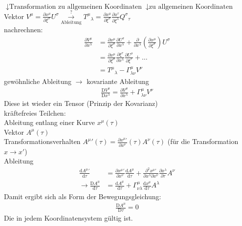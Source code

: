 \documentclass[a4paper]{article}
\begin{document}
$\downarrow \text{Transformation zu allgemeinen
Koordinaten}$$\downarrow\text{zu allgemeinen Koordinaten}$\\
Vektor $V^\mu=\frac{\partial x^\mu}{\partial \xi^\sigma}
U^\sigma\overset{?}{\underset{\text{Ableitung}}{\longrightarrow}}T^\mu{}_\lambda=
\frac{\partial x^\mu}{\partial \xi^\sigma}\frac{\partial x^\tau}{\partial
\xi^\lambda} Q^\sigma{}_\tau$\\
nachrechnen:
\begin{align}
\frac{\partial V^\mu}{\partial x^\lambda}&=\frac{\partial x^\mu}{\partial
\xi^\sigma}\frac{\partial U^\sigma}{\partial x^\lambda} +
\frac{\partial}{\partial x^\lambda} \left( \frac{\partial x^\mu}{\partial
\xi^\sigma} \right) U^\sigma\\
&=\frac{\partial x^\mu}{\partial \xi^\sigma}\frac{\partial
\xi^\tau}{\partial x^\lambda}\frac{\partial U^\sigma}{\partial
\xi^\tau}+\ldots\\
&=T^\mu{}_\lambda-\Gamma^\mu_{\lambda\nu}V^\nu
\end{align}
gewöhnliche Ableitung $\rightarrow$ kovariante Ableitung\\
\begin{align}
\frac{\mathrm{D}V^\mu}{\mathrm{D}x^\lambda}=\frac{\partial V^\mu}{\partial
x^\lambda}+ \Gamma^\mu_{\lambda\nu}V^\nu
\end{align}
Diese ist wieder ein Tensor (Prinzip der Kovarianz)\\
kräftefreies Teilchen:\\
Ableitung entlang einer Kurve $x^\mu(\tau)$\\
Vektor $A^\mu(\tau)$\\
Transformationsverhalten $A^\mu{}'(\tau)=\frac{\partial x^\mu{}'}{\partial
x^\nu}(\tau) A^\nu(\tau)$ (für die Transformation $x\rightarrow x'$)\\
Ableitung 
\begin{align}
\frac{\mathrm{d} A^\mu{}'}{\mathrm{d}\tau}&=\frac{\partial
x^\mu{}'}{\partial x^\nu} \frac{\mathrm{d} A^\mu}{\mathrm{d}\tau}+
\frac{\partial^2 x^\mu{}'}{\partial x^\lambda \partial x^\nu} \frac{\partial
x^\lambda}{\partial \tau}A^\nu\\
\rightarrow \frac{\mathrm{D} A^\mu}{\mathrm{d}\tau}&=\frac{\mathrm{d}
A^\mu}{\mathrm{d}\tau}+\Gamma^\mu_{\nu\lambda}\frac{\mathrm{d}
x^\mu}{\mathrm{d}\tau}A^\lambda
\end{align}
Damit ergibt sich als Form der Bewegungsgleichung:
\begin{align}
\frac{\mathrm{D}A^\mu}{\mathrm{D}\tau}=0
\end{align}
Die in jedem Koordinatensystem gültig ist.
\end{document}
